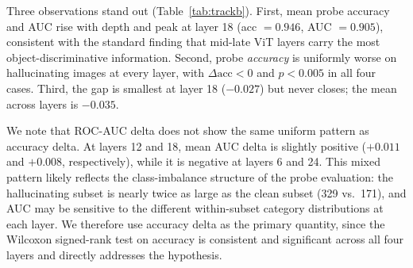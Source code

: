 \documentclass[11pt]{article}
\begin{document}
Three observations stand out (Table~\ref{tab:trackb}). First, mean probe accuracy and
AUC rise with depth and peak at layer 18 (acc $= 0.946$, AUC $= 0.905$), consistent
with the standard finding that mid-late ViT layers carry the most object-discriminative
information. Second, probe \emph{accuracy} is uniformly worse on hallucinating images
at every layer, with $\Delta\mathrm{acc} < 0$ and $p < 0.005$ in all four cases.
Third, the gap is smallest at layer 18 ($-0.027$) but never closes; the mean across
layers is $-0.035$.

We note that ROC-AUC delta does not show the same uniform pattern as accuracy delta.
At layers 12 and 18, mean AUC delta is slightly positive ($+0.011$ and $+0.008$,
respectively), while it is negative at layers 6 and 24. This mixed pattern likely
reflects the class-imbalance structure of the probe evaluation: the hallucinating subset
is nearly twice as large as the clean subset (329 vs.\ 171), and AUC may be sensitive to
the different within-subset category distributions at each layer. We therefore use
accuracy delta as the primary quantity, since the Wilcoxon signed-rank test on accuracy
is consistent and significant across all four layers and directly addresses the
hypothesis.

\begin{table}[!ht]
\centering
\caption{Track B linear probe accuracy across ViT depth, stratified by hallucination
         outcome. All four layers reach significance at $\alpha = 0.005$.}
\label{tab:trackb}
\end{table}
\end{document}
